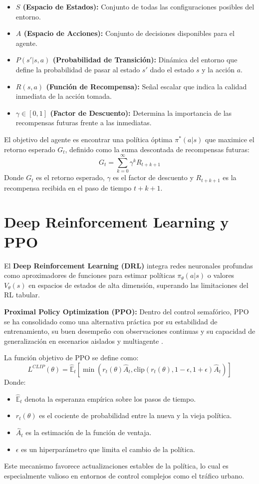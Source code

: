 \begin{itemize}
    \item \textbf{$S$ (Espacio de Estados):} Conjunto de todas las configuraciones posibles del entorno.
    \item \textbf{$A$ (Espacio de Acciones):} Conjunto de decisiones disponibles para el agente.
    \item \textbf{$P(s'|s,a)$ (Probabilidad de Transición):} Dinámica del entorno que define la probabilidad de pasar al estado $s'$ dado el estado $s$ y la acción $a$.
    \item \textbf{$R(s,a)$ (Función de Recompensa):} Señal escalar que indica la calidad inmediata de la acción tomada.
    \item \textbf{$\gamma \in [0,1]$ (Factor de Descuento):} Determina la importancia de las recompensas futuras frente a las inmediatas.
\end{itemize}

El objetivo del agente es encontrar una política óptima $\pi^*(a|s)$ que maximice el retorno esperado $G_t$, definido como la suma descontada de recompensas futuras:
\begin{equation}
    G_t = \sum_{k=0}^{\infty} \gamma^k R_{t+k+1}
\end{equation}
Donde $G_t$ es el retorno esperado, $\gamma$ es el factor de descuento y $R_{t+k+1}$ es la recompensa recibida en el paso de tiempo $t+k+1$.

\section{Deep Reinforcement Learning y PPO}
El \textbf{Deep Reinforcement Learning (DRL)} integra redes neuronales profundas como aproximadores de funciones para estimar políticas $\pi_\theta(a|s)$ o valores $V_\theta(s)$ en espacios de estados de alta dimensión, superando las limitaciones del RL tabular.

\textbf{Proximal Policy Optimization (PPO):}
Dentro del control semafórico, PPO se ha consolidado como una alternativa práctica por su estabilidad de entrenamiento, su buen desempeño con observaciones continuas y su capacidad de generalización en escenarios aislados y multiagente \cite{compare_ouyang2024,ppo_karedla2025,haps_ppo2025}.

La función objetivo de PPO se define como:
\begin{equation}
    L^{CLIP}(\theta) = \hat{\mathbb{E}}_t [ \min(r_t(\theta)\hat{A}_t, \text{clip}(r_t(\theta), 1-\epsilon, 1+\epsilon)\hat{A}_t) ]
\end{equation}
Donde:
\begin{itemize}
    \item $\hat{\mathbb{E}}_t$ denota la esperanza empírica sobre los pasos de tiempo.
    \item $r_t(\theta)$ es el cociente de probabilidad entre la nueva y la vieja política.
    \item $\hat{A}_t$ es la estimación de la función de ventaja.
    \item $\epsilon$ es un hiperparámetro que limita el cambio de la política.
\end{itemize}

Este mecanismo favorece actualizaciones estables de la política, lo cual es especialmente valioso en entornos de control complejos como el tráfico urbano.
